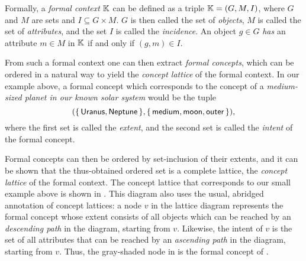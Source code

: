 Formally, a \emph{formal context} ${\mathbb{K}}$ can be defined as a triple ${\mathbb{K}} = (G, M,
I)$, where $G$ and $M$ are sets and $I \subseteq G \times M$.  $G$ is then called the set
of \emph{objects}, $M$ is called the set of \emph{attributes}, and the set $I$ is called
the \emph{incidence}.  An object $g \in G$ \emph{has} an attribute $m \in M$ in ${\mathbb{K}}$
if and only if $(g, m) \in I$.

From such a formal context one can then extract \emph{formal concepts}, which can be
ordered in a natural way to yield the \emph{concept lattice} of the formal context.  In
our example above, a formal concept which corresponds to the concept of a
\emph{medium-sized planet in our known solar system} would be the tuple
\begin{equation}
  \label{eq:60}
  ( {\{\, \mathsf{Uranus}, \mathsf{Neptune} \,\}}, {\{\, \mathsf{medium}, \mathsf{moon},
    \mathsf{outer} \,\}} ),
\end{equation}
where the first set is called the \emph{extent}, and the second set is called the
\emph{intent} of the formal concept.

Formal concepts can then be ordered by set-inclusion of their extents, and it can be shown
that the thus-obtained ordered set is a complete lattice, the \emph{concept lattice} of
the formal context.  The concept lattice that corresponds to our small example above is
shown in .  This diagram also uses the usual, abridged
annotation of concept lattices: a node $v$ in the lattice diagram represents the formal
concept whose extent consists of all objects which can be reached by an \emph{descending
  path} in the diagram, starting from $v$.  Likewise, the intent of $v$ is the set of all
attributes that can be reached by an \emph{ascending path} in the diagram, starting from
$v$.  Thus, the gray-shaded node in  is the formal
concept of .

